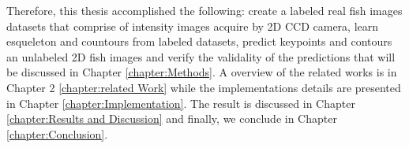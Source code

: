 Therefore, this thesis accomplished the following: create a labeled real fish images datasets
that comprise of intensity images acquire by 2D CCD camera, learn esqueleton and countours from
labeled datasets, predict keypoints and contours an unlabeled 2D fish images and verify the validality
of the predictions that will be discussed in Chapter \ref{chapter:Methods}. A overview
of the related works is in Chapter 2 \ref{chapter:related Work} while the implementations details are
presented in Chapter \ref{chapter:Implementation}. The result is discussed in Chapter \ref{chapter:Results and Discussion}
 and finally, we conclude in Chapter \ref{chapter:Conclusion}.

	


